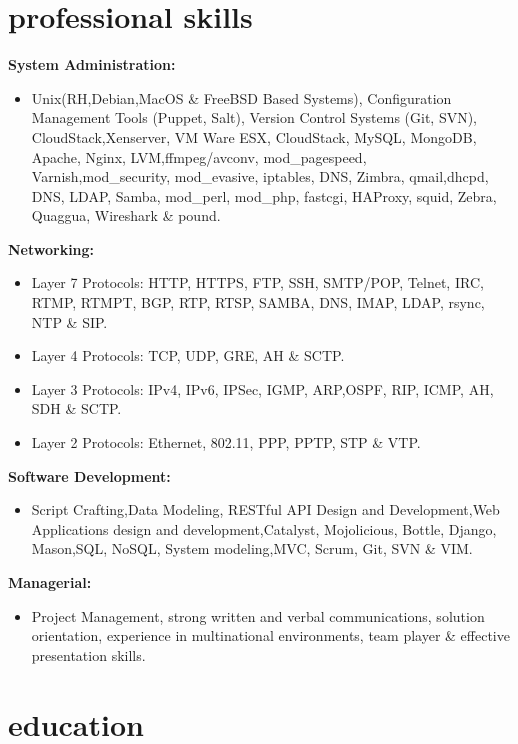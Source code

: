 \documentclass[]{friggeri-cv} %
\begin{document}
\section{professional skills}
{\large \textbf{System Administration:}}
\begin{itemize}
\item Unix(RH,Debian,MacOS \& FreeBSD Based Systems), Configuration Management Tools (Puppet, Salt), Version Control Systems (Git, SVN), CloudStack,Xenserver, VM Ware ESX, CloudStack, MySQL, MongoDB, Apache, Nginx, LVM,ffmpeg/avconv, mod\_pagespeed, \\ 
Varnish,mod\_security, mod\_evasive, iptables, DNS, Zimbra, qmail,dhcpd, DNS, LDAP, Samba, mod\_perl, mod\_php, fastcgi, HAProxy, squid, Zebra, Quaggua, Wireshark \& pound.  
\end{itemize}
{\large \textbf{Networking:}}
\begin{itemize}
\item Layer 7 Protocols: HTTP, HTTPS, FTP, SSH, SMTP/POP, Telnet, IRC, RTMP, RTMPT, BGP, RTP, RTSP, SAMBA, DNS, IMAP, LDAP, rsync, NTP \& SIP. 
\item Layer 4 Protocols: TCP, UDP, GRE, AH \& SCTP.
\item Layer 3 Protocols: IPv4, IPv6, IPSec, IGMP, ARP,OSPF, RIP, ICMP, AH, SDH \& SCTP.
\item Layer 2 Protocols: Ethernet, 802.11, PPP, PPTP, STP \& VTP.
\end{itemize}
{\large \textbf{Software Development:}}
\begin{itemize}
\item Script Crafting,Data Modeling, RESTful API Design and Development,Web Applications design and development,Catalyst, Mojolicious, Bottle, Django, Mason,SQL, NoSQL, System modeling,MVC, Scrum, Git, SVN \& VIM.
\end{itemize}
{\large \textbf{Managerial:}}
\begin{itemize}
\item Project Management, strong written and verbal communications, solution orientation, experience in multinational environments, team player  \& effective presentation skills. 
\end{itemize}

\section{education}
\end{document}

